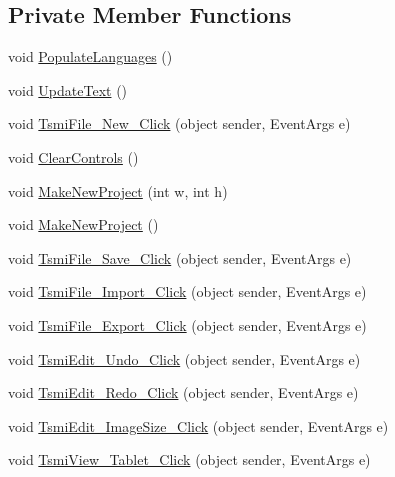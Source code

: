 \subsection*{Private Member Functions}
\begin{DoxyCompactItemize}
\item 
void \mbox{\hyperlink{class_paint___program_1_1_form1_a616e4f7ed06b9d03f9794c6150c55bec}{Populate\+Languages}} ()
\item 
void \mbox{\hyperlink{class_paint___program_1_1_form1_a14fd317ce19e4a4c5cd44aba2ea750a1}{Update\+Text}} ()
\item 
void \mbox{\hyperlink{class_paint___program_1_1_form1_ade0d4d5a5b74af8a5ee99912745632d7}{Tsmi\+File\+\_\+\+New\+\_\+\+Click}} (object sender, Event\+Args e)
\item 
void \mbox{\hyperlink{class_paint___program_1_1_form1_a39a6d9fbd5f250daa6fdbdc3d427c743}{Clear\+Controls}} ()
\item 
void \mbox{\hyperlink{class_paint___program_1_1_form1_ae2b2f92fe493ccef4b1c943ecc98f693}{Make\+New\+Project}} (int w, int h)
\item 
void \mbox{\hyperlink{class_paint___program_1_1_form1_a2aa0c38b6361f4992c9837e7819e01ee}{Make\+New\+Project}} ()
\item 
void \mbox{\hyperlink{class_paint___program_1_1_form1_ad6ed55aa3e56805f2657b831f49f6331}{Tsmi\+File\+\_\+\+Save\+\_\+\+Click}} (object sender, Event\+Args e)
\item 
void \mbox{\hyperlink{class_paint___program_1_1_form1_af074be280a47db857d9b7d649fb23932}{Tsmi\+File\+\_\+\+Import\+\_\+\+Click}} (object sender, Event\+Args e)
\item 
void \mbox{\hyperlink{class_paint___program_1_1_form1_a12af75ac6e998a5d7091c51368e0ab1c}{Tsmi\+File\+\_\+\+Export\+\_\+\+Click}} (object sender, Event\+Args e)
\item 
void \mbox{\hyperlink{class_paint___program_1_1_form1_a3fd2977a63399c5cf772ba43a085291d}{Tsmi\+Edit\+\_\+\+Undo\+\_\+\+Click}} (object sender, Event\+Args e)
\item 
void \mbox{\hyperlink{class_paint___program_1_1_form1_aae2330807cd6eaacb82e143b2ffbe668}{Tsmi\+Edit\+\_\+\+Redo\+\_\+\+Click}} (object sender, Event\+Args e)
\item 
void \mbox{\hyperlink{class_paint___program_1_1_form1_a1034728c62e4c62d618133811093749f}{Tsmi\+Edit\+\_\+\+Image\+Size\+\_\+\+Click}} (object sender, Event\+Args e)
\item 
void \mbox{\hyperlink{class_paint___program_1_1_form1_a97c7127920edd9d1039c0b6429d5649c}{Tsmi\+View\+\_\+\+Tablet\+\_\+\+Click}} (object sender, Event\+Args e)

\end{DoxyCompactItemize}
